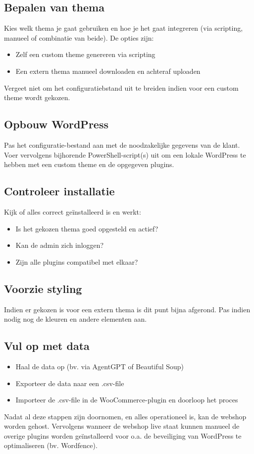 \subsection{Bepalen van thema}
Kies welk thema je gaat gebruiken en hoe je het gaat integreren (via scripting, manueel of combinatie van beide). De opties zijn:
\begin{itemize}
    \item Zelf een custom theme genereren via scripting
    \item Een extern thema manueel downloaden en achteraf uploaden
\end{itemize}
Vergeet niet om het configuratiebstand uit te breiden indien voor een custom theme wordt gekozen.
\subsection{Opbouw WordPress}
Pas het configuratie-bestand aan met de noodzakelijke gegevens van de klant. Voer vervolgens bijhorende PowerShell-script(s) uit om een lokale WordPress te hebben met een custom theme en de opgegeven plugins. 
\subsection{Controleer installatie}
Kijk of alles correct geïnstalleerd is en werkt:
\begin{itemize}
    \item Is het gekozen thema goed opgesteld en actief?
    \item Kan de admin zich inloggen?
    \item Zijn alle plugins compatibel met elkaar? 
\end{itemize}
\subsection{Voorzie styling}
Indien er gekozen is voor een extern thema is dit punt bijna afgerond. Pas indien nodig nog de kleuren en andere elementen aan. 
\subsection{Vul op met data}
\begin{itemize}
    \item Haal de data op (bv. via AgentGPT of Beautiful Soup)
    \item Exporteer de data naar een .csv-file
    \item Importeer de .csv-file in de WooCommerce-plugin en doorloop het proces
\end{itemize}
Nadat al deze stappen zijn doornomen, en alles operationeel is, kan de webshop worden gehost. Vervolgens wanneer de webshop live staat kunnen manueel de overige plugins worden geïnstalleerd voor o.a. de beveiliging van WordPress te optimaliseren (bv. Wordfence).
